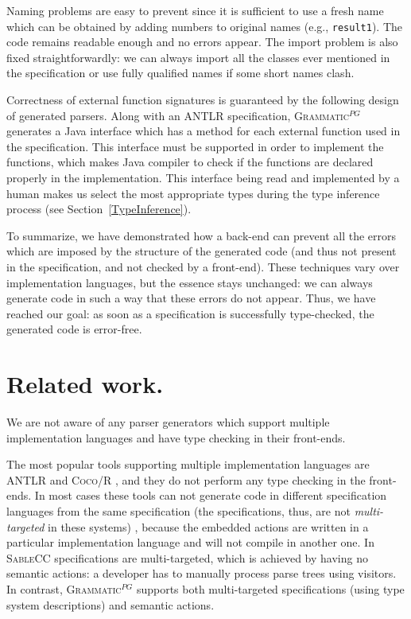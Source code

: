\documentclass{informat} %
\newcommand{\secref}[1]{Section~\ref{#1}}
\newcommand{\tool}[1]{\textsc{#1}}
\newcommand{\ATF}{\textsc{Grammatic}$^{PG}$}
\begin{document}
Naming problems are easy to prevent since it is sufficient to use a fresh name which can be obtained by adding numbers to original names (e.g., \texttt{result1}). The code remains readable enough and no errors appear.  
The import problem is also fixed straightforwardly: we can always import all the classes ever mentioned in the specification or use fully qualified names if some short names clash.

Correctness of external function signatures is guaranteed by the following design of generated parsers. Along with an \tool{ANTLR} specification, \ATF{} generates a Java interface which has a method for each external function used in the specification. This interface must be supported in order to implement the functions, which makes Java compiler to check if the functions are declared properly in the implementation. This interface being read and implemented by a human makes us select the most appropriate types during the type inference process (see \secref{TypeInference}).

To summarize, we have demonstrated how a back-end can prevent all the errors which are imposed by the structure of the generated code (and thus not present in the specification, and not checked by a front-end). These techniques vary over implementation languages, but the essence stays unchanged: we can always generate code in such a way that these errors do not appear.
Thus, we have reached our goal: as soon as a specification is successfully type-checked, the generated code is error-free.


\section{Related work.}\label{RelatedWork}

We are not aware of any parser generators which support multiple implementation languages and have type checking in their front-ends.

The most popular tools supporting multiple implementation languages are \tool{ANTLR} \cite{ANTLR} and \tool{Coco/R} \cite{Coco/R}, and they do not perform any type checking in the front-ends. In most cases these tools can not generate code in different specification languages from the same specification (the specifications, thus, are not \emph{multi-targeted} in these systems) , because the embedded actions are written in a particular implementation language and will not compile in another one. In \tool{SableCC} \cite{SableCC} specifications are multi-targeted, which is achieved by having no semantic actions: a developer has to manually process parse trees using visitors. In contrast, \ATF{} supports both multi-targeted specifications (using type system descriptions) and semantic actions.
\end{document}
